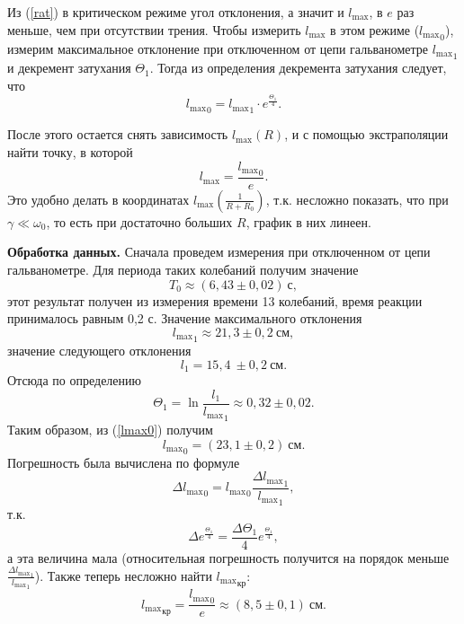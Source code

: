 \documentclass[12pt,a4paper]{article}
\begin{document}
Из (\ref{rat}) в критическом режиме угол отклонения, а значит и $l_\text{max}$, в $e$ раз меньше, чем при отсутствии трения. Чтобы измерить $l_\text{max}$ в этом режиме (${l_\text{max}}_0$), измерим максимальное отклонение при отключенном от цепи гальванометре ${l_\text{max}}_1$ и декремент затухания $\Theta_1$. Тогда из определения декремента затухания следует, что
\begin{equation}
{l_\text{max}}_0 = {l_\text{max}}_1\cdot e^{\frac{\Theta_1}{4}}.\label{lmax0}
\end{equation}

После этого остается снять зависимость $l_\text{max}(R)$, и с помощью экстраполяции найти точку, в которой
\begin{equation}
l_\text{max} = \frac{{l_\text{max}}_0}{e}.
\end{equation}
Это удобно делать в координатах $l_\text{max}\left(\frac{1}{R+R_0}\right)$, т.к. несложно показать, что при $\gamma \ll \omega_0$, то есть при достаточно больших $R$, график в них линеен.

\textbf{Обработка данных.} Сначала проведем измерения при отключенном от цепи гальванометре. Для периода таких колебаний получим значение
\begin{equation}
T_0 \approx (6,43 \pm 0,02)~\text{с},
\end{equation}
этот результат получен из измерения времени 13 колебаний, время реакции принималось равным 0,2 с. Значение максимального отклонения 
\begin{equation}
{l_\text{max}}_1 \approx 21,3\pm0,2~\text{см},
\end{equation}
значение следующего отклонения
\begin{equation} 
l_1 = 15,4~\pm0,2~\text{см}.
\end{equation}
Отсюда по определению
\begin{equation}
\Theta_1 = \ln\frac{l_1}{{l_\text{max}}_1} \approx 0,32\pm0,02.
\end{equation}
Таким образом, из (\ref{lmax0}) получим
\begin{equation}
{l_\text{max}}_0 = (23,1\pm0,2)~\text{см}.\label{lmax0val}
\end{equation}
Погрешность была вычислена по формуле
\begin{equation}
\Delta {l_\text{max}}_0 = {l_\text{max}}_0\frac{\Delta {l_\text{max}}_1}{{l_\text{max}}_1},
\end{equation}
т.к.
\begin{equation}
\Delta e^{\frac{\Theta_1}{4}} = \frac{\Delta\Theta_1}{4}e^{\frac{\Theta_1}{4}},
\end{equation}
а эта величина мала (относительная погрешность получится на порядок меньше $\frac{\Delta {l_\text{max}}_1}{{l_\text{max}}_1}$). Также теперь несложно найти ${l_\text{max}}_\text{кр}$:
\begin{equation}
{l_\text{max}}_\text{кр} = \frac{{l_\text{max}}_0}{e} \approx (8,5\pm0,1)~\text{см}. 
\end{equation}
\end{document}
